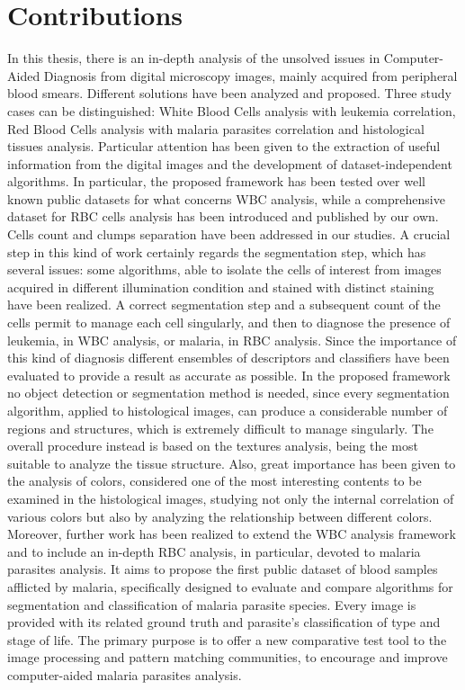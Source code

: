 \section{Contributions} 
In this thesis, there is an in-depth analysis of the unsolved issues in Computer-Aided Diagnosis from digital microscopy images, mainly acquired from peripheral blood smears. Different solutions have been analyzed and proposed. Three study cases can be distinguished: White Blood Cells analysis with leukemia correlation, Red Blood Cells analysis with malaria parasites correlation and histological tissues analysis. Particular attention has been given to the extraction of useful information from the digital images and the development of dataset-independent algorithms. In particular, the proposed framework has been tested over well known public datasets for what concerns WBC analysis, while a comprehensive dataset for RBC cells analysis has been introduced and published by our own. Cells count and clumps separation have been addressed in our studies. A crucial step in this kind of work certainly regards the segmentation step, which has several issues: some algorithms, able to isolate the cells of interest from images acquired in different illumination condition and stained with distinct staining have been realized. A correct segmentation step and a subsequent count of the cells permit to manage each cell singularly, and then to diagnose the presence of leukemia, in WBC analysis, or malaria, in RBC analysis. Since the importance of this kind of diagnosis different ensembles of descriptors and classifiers have been evaluated to provide a result as accurate as possible. In the proposed framework no object detection or segmentation method is needed, since every segmentation algorithm, applied to histological images, can produce a considerable number of regions and structures, which is extremely difficult to manage singularly. The overall procedure instead is based on the textures analysis, being the most suitable to analyze the tissue structure. Also, great importance has been given to the analysis of colors, considered one of the most interesting contents to be examined in the histological images, studying not only the internal correlation of various colors but also by analyzing the relationship between different colors.
Moreover, further work has been realized to extend the WBC analysis framework and to include an in-depth RBC analysis, in particular, devoted to malaria parasites analysis. It aims to propose the first public dataset of blood samples afflicted by malaria, specifically designed to evaluate and compare algorithms for segmentation and classification of malaria parasite species. Every image is provided with its related ground truth and parasite's classification of type and stage of life. The primary purpose is to offer a new comparative test tool to the image processing and pattern matching communities, to encourage and improve computer-aided malaria parasites analysis.
